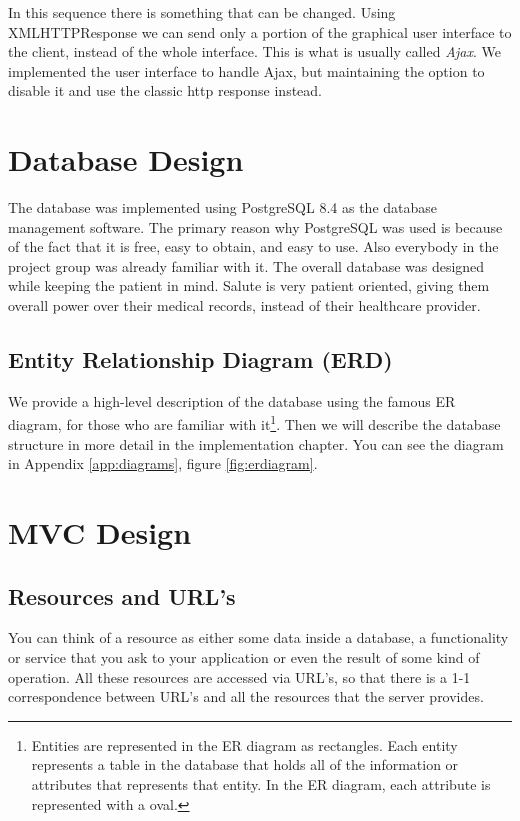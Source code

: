 In this sequence there is something that can be changed. Using XMLHTTPResponse we can send only a portion of the graphical user interface to the client, instead of the whole interface. This is what is usually called \emph{Ajax}. We implemented the user interface to handle Ajax, but maintaining the option to disable it and use the classic http response instead.


\section{Database Design}
The database was implemented using PostgreSQL 8.4 as the database management software.  The primary reason why PostgreSQL was used is because of the fact that it is free, easy to obtain, and easy to use. Also everybody in the project group was already familiar with it.
The overall database was designed while keeping the patient in mind.  Salute is very patient oriented, giving them overall  power over their medical records, instead of their healthcare provider.

\subsection{Entity Relationship Diagram (ERD)}
We provide a high-level description of the database using the famous ER diagram, for those who are familiar with it\footnote{Entities are represented in the ER diagram as rectangles.  Each entity represents a table in the database that holds all of the information or attributes that represents that entity.  In the ER diagram, each attribute is represented with a oval.}. Then we will describe the database structure in more detail in the implementation chapter. You can see the diagram in Appendix \ref{app:diagrams}, figure \ref{fig:erdiagram}.


\section{MVC Design}

\subsection{Resources and URL's}
You can think of a resource as either some data inside a database, a functionality or service that you ask to your application or even the result of some kind of operation. All these resources are accessed via URL's, so that there is a 1-1 correspondence between URL's and all the resources that the server provides.

